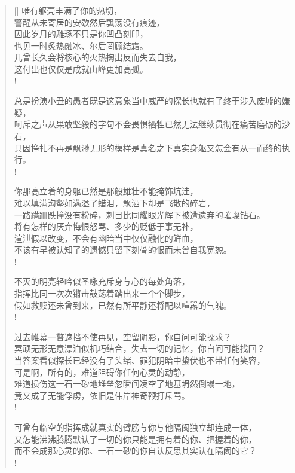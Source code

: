 \documentclass[UTF8, 12pt, a4paper]{ctexrep} %
\begin{document}
\begin{verse}[\versewidth]
唯有躯壳丰满了你的热切，\\
警醒从未寄居的安歇然后飘荡没有痕迹，\\
因此岁月的雕琢不只是你凹凸刻印，\\
也见一时炙热融冰、尔后罔顾结霜。\\
几曾长久会将核心的火热掏出反而失去自我，\\
这付出也仅仅是成就山峰更加高孤。\\!

总是扮演小丑的愚者既是这意象当中威严的探长也就有了终于涉入废墟的嫌疑，\\
呵斥之声从果敢坚毅的字句不会畏惧牺牲已然无法继续贯彻在痛苦磨砺的沙石，\\
只因挣扎不再是飘渺无形的模样是真名之下真实身躯又怎会有从一而终的执行。\\!

你那高立着的身躯已然是那般雄壮不能掩饰坑洼，\\
难以填满沟壑如满溢了蜡泪，飘洒下却是飞散的碎岩，\\
一路蹒跚跌撞没有粉碎，刺目比同耀眼光辉下被遭遗弃的璀璨钻石。\\
将有怎样的厌弃悔恨怒骂、多少的贬低于事无补，\\
渲泄假以改变，不会有幽暗当中仅仅融化的鲜血，\\
不该有早被认知了的遗憾只留下刻骨的恨而未曾自我宽恕。\\!

不灭的明亮轻吟似圣咏充斥身与心的每处角落，\\
指挥比同一次次锵击鼓荡着踏出来一个个脚步，\\
假如救赎还未曾到来，已然有所平静还将配以喧嚣的气魄。\\!

过去帷幕一瞥遮挡不使再见，空留阴影，你自问可能探求？\\
冥顽无形无意漂泊似机巧结合，失去一切的记忆，你自问可能找回？\\
当答案看似探长已经没有了头绪、罪犯阴暗中蛰伏也不带任何笑容，\\
可是啊，所有的，难道阻碍你任何心灵的动静，\\
难道损伤这一石一砂地堆垒忽瞬间凌空了地基坍然倒塌一地，\\
竟又成了无能俘虏，依旧是伟岸神奇鞭打斥骂。\\!

可曾有临空的指挥成就真实的臂膀与你与他隔阂独立却连成一体，\\
又怎能沸沸腾腾默认了一切的你只能是拥有着的你、把握着的你，\\
而不会成那心灵的你、一石一砂的你自认反思其实认在隔阂的它？\\!

\end{verse}
\end{document}
